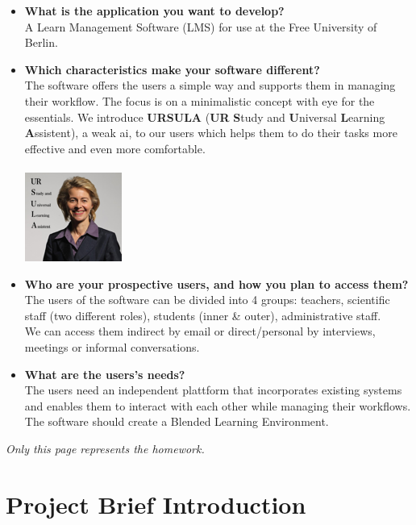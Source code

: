 \documentclass{article}
\begin{document}
\begin{itemize}
\item \textbf{What is the application you want to develop?}\\
A Learn Management Software (LMS) for use at the Free University of Berlin.

\item \textbf{Which characteristics make your software different?}\\
The software offers the users a simple way and supports them in managing their workflow. The focus is on a minimalistic concept with eye for the essentials. We introduce \textbf{URSULA} (\textbf{UR} \textbf{S}tudy and \textbf{U}niversal \textbf{L}earning \textbf{A}ssistent), a weak ai, to our users which helps them to do their tasks more effective and even more comfortable.\\
\\
\includegraphics{URSULA.png}

\item \textbf{Who are your prospective users, and how you plan to access them?}\\
The users of the software can be divided into 4 groups: teachers, scientific staff (two different roles), students (inner \& outer), administrative staff.\\
We can access them indirect by email or direct/personal by interviews, meetings or informal conversations.

\item \textbf{What are the users's needs?}\\
The users need an independent plattform that incorporates existing systems and enables them to interact with each other while managing their workflows. The software should create a Blended Learning Environment.
\end{itemize}

\newpage

\textit{Only this page represents the homework.}

\section{Project Brief Introduction}
\end{document}
